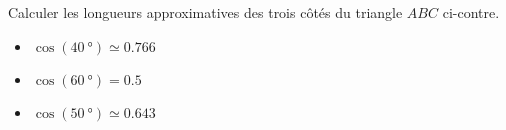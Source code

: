 
\begin{exercice}\label{exo2smath-0274}

    \begin{multicols}{2}

    Calculer les longueurs approximatives des trois côtés du triangle \( ABC\) ci-contre. 

    \begin{itemize}
        \item \( \cos(\SI{40}{\degree})\simeq 0.766\)
        \item \( \cos(\SI{60}{\degree})= 0.5\)
        \item \( \cos(\SI{50}{\degree})\simeq 0.643\)
    \end{itemize}
    

\columnbreak

\begin{center}                                                                                                            
                                        
\end{center} 
    \end{multicols}


\end{exercice}
